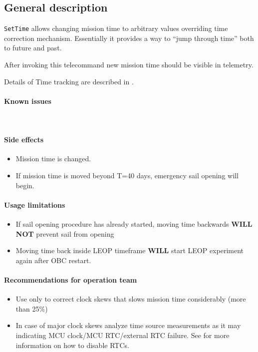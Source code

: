 

\subsection{General description}
\texttt{SetTime} allows changing mission time to arbitrary values overriding time correction mechanism. Essentially it provides a way to ``jump through time'' both to future and past.

After invoking this telecommand new mission time should be visible in telemetry.

Details of Time tracking are described in .

\paragraph{Known issues} \mbox{}\\
\None

\paragraph{Side effects}
\begin{itemize}
	\item Mission time is changed.
	\item If mission time is moved beyond T=40 days, emergency sail opening will begin.
\end{itemize}

\paragraph{Usage limitations}
\begin{itemize}
	\item If sail opening procedure has already started, moving time backwards \textbf{WILL NOT} prevent sail from opening
	\item Moving time back inside LEOP timeframe \textbf{WILL} start LEOP experiment again after OBC restart.
\end{itemize}

\paragraph{Recommendations for operation team}
\begin{itemize}
	\item Use only to correct clock skews that slows mission time considerably (more than 25\%)
	\item In case of major clock skews analyze time source measurements as it may indicating MCU clock/MCU RTC/external RTC failure. See  for more information on how to disable RTCs.
\end{itemize}


